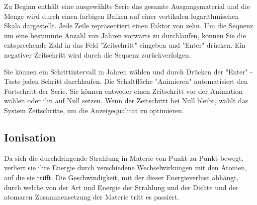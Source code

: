 Zu Beginn enthält eine ausgewählte Serie das gesamte Ausgangsmaterial und die Menge wird durch einen farbigen Balken auf einer vertikalen logarithmischen Skala dargestellt. Jede Zeile repräsentiert einen Faktor von zehn. Um die Sequenz um eine bestimmte Anzahl von Jahren vorwärts zu durchlaufen, können Sie die entsprechende Zahl in das Feld "Zeitschritt" eingeben und "Enter" drücken. Ein negativer Zeitschritt wird durch die Sequenz zurückverfolgen.

Sie können ein Schrittintervall in Jahren wählen und durch Drücken der "Enter" -Taste jeden Schritt durchlaufen. Die Schaltfläche "Animieren" automatisiert den Fortschritt der Serie. Sie können entweder einen Zeitschritt vor der Animation wählen oder ihn auf Null setzen. Wenn der Zeitschritt bei Null bleibt, wählt das System Zeitschritte, um die Anzeigequalität zu optimieren.
\subsection{Ionisation}

Da sich die durchdringende Strahlung in Materie von Punkt zu Punkt bewegt, verliert sie ihre Energie durch verschiedene Wechselwirkungen mit den Atomen, auf die sie trifft. Die Geschwindigkeit, mit der dieser Energieverlust abhängt, durch welche von der Art und Energie der Strahlung und der Dichte und der atomaren Zusammensetzung der Materie tritt es passiert.

